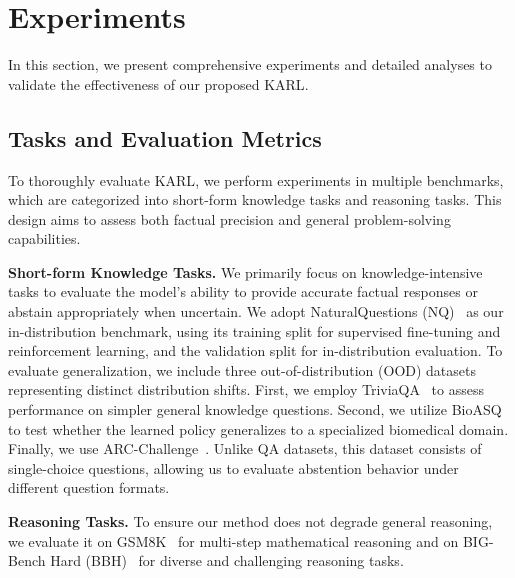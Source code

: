 \documentclass{article} %
\newcommand{\framename}{\textsc{KARL}}
\begin{document}
\section{Experiments}
\label{sec:experiments}
In this section, we present comprehensive experiments and detailed analyses to validate the effectiveness of our proposed \framename{}.

\subsection{Tasks and Evaluation Metrics}
\label{sec:datasets}

To thoroughly evaluate \framename{}, we perform experiments in multiple benchmarks, which are categorized into short-form knowledge tasks and reasoning tasks. This design aims to assess both factual precision and general problem-solving capabilities.


\noindent
\textbf{Short-form Knowledge Tasks.}
We primarily focus on knowledge-intensive tasks to evaluate the model's ability to provide accurate factual responses or abstain appropriately when uncertain.
We adopt NaturalQuestions (NQ)~\citep{NQ} as our in-distribution benchmark, using its training split for supervised fine-tuning and reinforcement learning, and the validation split for in-distribution evaluation.
To evaluate generalization, we include three out-of-distribution (OOD) datasets representing distinct distribution shifts.
First, we employ TriviaQA~\citep{Triviaqa} to assess performance on simpler general knowledge questions.
Second, we utilize BioASQ~\citep{BioASQ} to test whether the learned policy generalizes to a specialized biomedical domain.
Finally, we use ARC-Challenge~\citep{ARC}.
Unlike QA datasets, this dataset consists of single-choice questions, allowing us to evaluate abstention behavior under different question formats.

\noindent
\textbf{Reasoning Tasks.}
To ensure our method does not degrade general reasoning, we evaluate it on GSM8K~\citep{GSM8K} for multi-step mathematical reasoning and on BIG-Bench Hard (BBH)~\citep{BBH} for diverse and challenging reasoning tasks.
\end{document}
